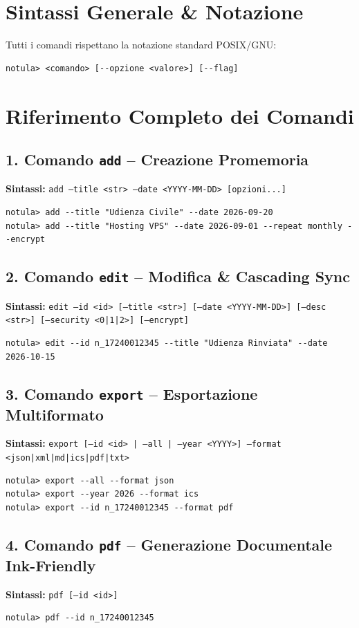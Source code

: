\documentclass[11pt,a4paper]{article}
\begin{document}
\section{Sintassi Generale \& Notazione}
Tutti i comandi rispettano la notazione standard POSIX/GNU:
\begin{lstlisting}[style=notulacli]
notula> <comando> [--opzione <valore>] [--flag]
\end{lstlisting}

\section{Riferimento Completo dei Comandi}

\subsection{1. Comando \texttt{add} -- Creazione Promemoria}
\textbf{Sintassi:} \texttt{add --title <str> --date <YYYY-MM-DD> [opzioni...]}
\begin{lstlisting}[style=notulacli]
notula> add --title "Udienza Civile" --date 2026-09-20
notula> add --title "Hosting VPS" --date 2026-09-01 --repeat monthly --encrypt
\end{lstlisting}

\subsection{2. Comando \texttt{edit} -- Modifica \& Cascading Sync}
\textbf{Sintassi:} \texttt{edit --id <id> [--title <str>] [--date <YYYY-MM-DD>] [--desc <str>] [--security <0|1|2>] [--encrypt]}
\begin{lstlisting}[style=notulacli]
notula> edit --id n_17240012345 --title "Udienza Rinviata" --date 2026-10-15
\end{lstlisting}

\subsection{3. Comando \texttt{export} -- Esportazione Multiformato}
\textbf{Sintassi:} \texttt{export [--id <id> | --all | --year <YYYY>] --format <json|xml|md|ics|pdf|txt>}
\begin{lstlisting}[style=notulacli]
notula> export --all --format json
notula> export --year 2026 --format ics
notula> export --id n_17240012345 --format pdf
\end{lstlisting}

\subsection{4. Comando \texttt{pdf} -- Generazione Documentale Ink-Friendly}
\textbf{Sintassi:} \texttt{pdf [--id <id>]}
\begin{lstlisting}[style=notulacli]
notula> pdf --id n_17240012345
\end{lstlisting}
\end{document}
